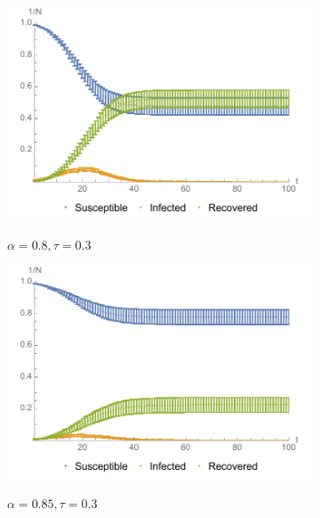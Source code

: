 \documentclass[11pt]{article}
\begin{document}
\begin{figure}[t]
\begin{subfigure}[b]{0.49\textwidth}
    	\includegraphics[width=\textwidth]{sir_alpha08_tau03_omega1_beta05_gamma03_expk2_runs50_notitle.pdf}
        \label{fig:sir_8030}
        \caption{$\alpha=0.8, \tau=0.3$}
	\end{subfigure}
	\begin{subfigure}[b]{0.49\textwidth}
    	\includegraphics[width=\textwidth]{sir_alpha085_tau03_omega1_beta05_gamma03_expk2_runs50_notitle.pdf}
        \label{fig:sir_8530}
        \caption{$\alpha=0.85, \tau=0.3$}
	\end{subfigure}
	\begin{subfigure}[b]{0.49\textwidth}

\end{subfigure}
\end{figure}
\end{document}
